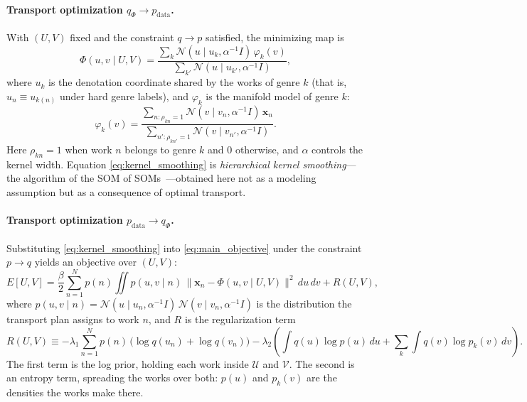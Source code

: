 \paragraph{Transport optimization $q_\Phi \rightarrow p_\text{data}$.}
With $(U, V)$ fixed and the constraint $q \rightarrow p$ satisfied,
the minimizing map is
\begin{equation}
    \Phi(u, v \mid U, V) =
    \frac{\sum_k \mathcal{N}(u \mid u_k, \alpha^{-1} I)\, \varphi_k(v)}
    {\sum_{k'} \mathcal{N}(u \mid u_{k'}, \alpha^{-1} I)},
    \label{eq:kernel_smoothing}
\end{equation}
where $u_k$ is the denotation coordinate shared by the works of genre
$k$ (that is, $u_n \equiv u_{k(n)}$ under hard genre labels), and
$\varphi_k$ is the manifold model of genre $k$:
\begin{equation}\label{eq:varphi}
    \varphi_k(v) =
    \frac{\sum_{n:\rho_{kn}=1} \mathcal{N}(v \mid v_n, \alpha^{-1} I)\,
        \mathbf{x}_n}
    {\sum_{n':\rho_{kn'}=1} \mathcal{N}(v \mid v_{n'}, \alpha^{-1} I)}.
\end{equation}
Here $\rho_{kn} = 1$ when work $n$ belongs to genre $k$ and $0$
otherwise, and $\alpha$ controls the kernel width. Equation
\eqref{eq:kernel_smoothing} is \textit{hierarchical kernel
    smoothing}---the algorithm of the SOM of
SOMs~\citep{Furukawa2009463}---obtained here not as a modeling
assumption but as a consequence of optimal transport.

\paragraph{Transport optimization $p_\text{data} \rightarrow q_\Phi$.}
Substituting \eqref{eq:kernel_smoothing} into
\eqref{eq:main_objective} under the constraint $p \rightarrow q$
yields an objective over $(U, V)$:
\begin{equation}\label{eq:E-UV}
    E[U, V] = \frac{\beta}{2}\sum_{n=1}^N p(n)
    \iint p(u, v \mid n)\,
    \bigl\|\mathbf{x}_n - \Phi(u, v \mid U, V)\bigr\|^2
    \, du\, dv
    + R(U, V),
\end{equation}
where $p(u, v \mid n)=\mathcal{N}(u\mid u_n,\alpha^{-1} I)\,\mathcal{N}(v\mid v_n,
    \alpha^{-1} I)$ is the distribution the transport plan assigns to
work $n$, and $R$ is the regularization term
\begin{equation*}
    R(U, V) \equiv
    - \lambda_1 \sum_{n=1}^N p(n)\,
    \bigl(\log q(u_n) + \log q(v_n)\bigr)
    - \lambda_2 \left(
    \int q(u)\log p(u)\, du
    + \sum_k \int q(v)\log p_k(v)\, dv
    \right).
\end{equation*}
The first term is the log prior, holding each work inside $\mathcal{U}$ and
$\mathcal{V}$. The second is an entropy term, spreading the works over both:
$p(u)$ and $p_k(v)$ are the densities the works make there.


